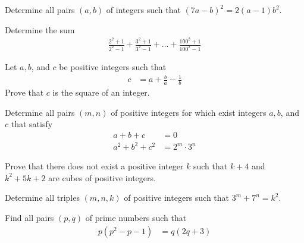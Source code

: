 \documentclass[problems.tex]{subfile}
\begin{document}
	\begin{problem}
		Determine all pairs $(a, b)$ of integers such that $(7a - b)^2 = 2(a - 1)b^2$.
	\end{problem}

	\begin{problem}
		Determine the sum
		\begin{align*}
			\frac{2^2+1}{2^2-1} + \frac{3^2+1}{3^2-1} + \dots + \frac{100^2+1}{100^2-1}
		\end{align*}
	\end{problem}

	\begin{problem}
		Let $a,b$, and $c$ be positive integers such that
		\begin{align*}
			c &= a + \frac{b}{a} - \frac{1}{b}
		\end{align*}
		Prove that $c$ is the square of an integer.
	\end{problem}

	\begin{problem}
		Determine all pairs $(m, n)$ of positive integers for which exist integers $a, b$, and $c$ that satisfy
		\begin{align*}
			a+b+c
				& =0\\
			a^2+b^2+c^2
				& =2^m \cdot 3^n
		\end{align*}
	\end{problem}

	\begin{problem}
		Prove that there does not exist a positive integer $k$ such that $k + 4$ and $k^2 + 5k + 2$ are cubes of positive integers.
	\end{problem}

	\begin{problem}
		Determine all triples $(m, n, k)$ of positive integers such that $3^m + 7^n = k^2$.
	\end{problem}

	\begin{problem}
		Find all pairs $(p,q)$ of prime numbers such that
			\begin{align*}
				p(p^2 - p - 1)
					& = q(2q + 3)
			\end{align*}
	\end{problem}
\end{document}
